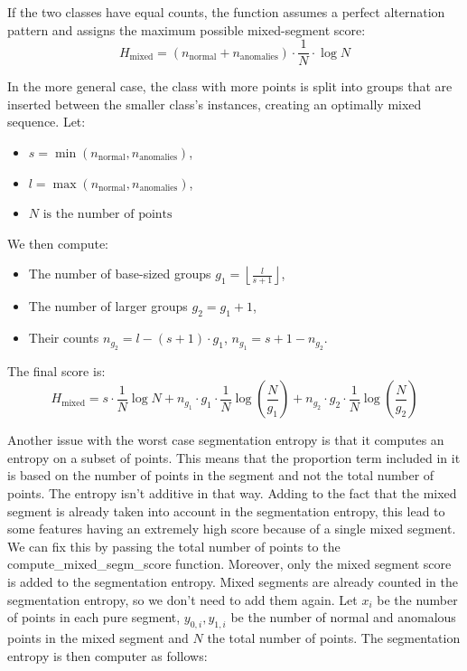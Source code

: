 \documentclass[11pt]{article}
\begin{document}
If the two classes have equal counts, the function assumes a perfect alternation pattern and assigns the maximum possible mixed-segment score:
\[
H_{\text{mixed}} = (n_{\text{normal}} + n_{\text{anomalies}}) \cdot \frac{1}{N} \cdot \log N
\]

In the more general case, the class with more points is split into groups that are inserted between the smaller class's instances, creating an optimally mixed sequence. Let:
\begin{itemize}
  \item \( s = \min(n_{\text{normal}}, n_{\text{anomalies}}) \),
  \item \( l = \max(n_{\text{normal}}, n_{\text{anomalies}}) \),
  \item \( N \text{ is the number of points}\)
\end{itemize}

We then compute:
\begin{itemize}
  \item The number of base-sized groups \( g_1 = \left\lfloor \frac{l}{s + 1} \right\rfloor \),
  \item The number of larger groups \( g_2 = g_1 + 1 \),
  \item Their counts \( n_{g_2} = l - (s + 1) \cdot g_1 \), \( n_{g_1} = s + 1 - n_{g_2} \).
\end{itemize}

The final score is:
\[
H_{\text{mixed}} = s \cdot \frac{1}{N} \log N + n_{g_1} \cdot g_1 \cdot \frac{1}{N} \log\left(\frac{N}{g_1}\right) + n_{g_2} \cdot g_2 \cdot \frac{1}{N} \log\left(\frac{N}{g_2}\right)
\]


Another issue with the worst case segmentation entropy is that it computes an entropy on a subset of points. This means that the proportion term included in it is based on the number of points in the segment and not the total number of points. The entropy isn't additive in that way. Adding to the fact that the mixed segment is already taken into account in the segmentation entropy, this lead to some features having an extremely high score because of a single mixed segment. We can fix this by passing the total number of points to the compute\_mixed\_segm\_score function. Moreover, only the mixed segment score is added to the segmentation entropy. Mixed segments are already counted in the segmentation entropy, so we don't need to add them again. Let $x_i$ be the number of points in each pure segment, $y_{0, i}, y_{1, i}$ be the number of normal and anomalous points in the mixed segment and $N$ the total number of points. The segmentation entropy is then computer as follows:
\end{document}
